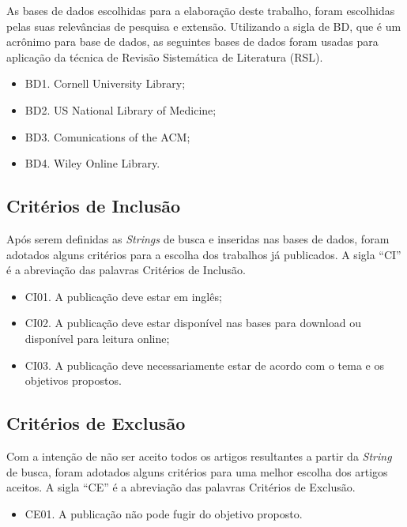 As bases de dados escolhidas para a elaboração deste trabalho, foram escolhidas pelas suas relevâncias de pesquisa e extensão. Utilizando a sigla de BD, que é um acrônimo para base de dados, as seguintes bases de dados foram usadas para aplicação da técnica de Revisão Sistemática de Literatura (RSL).

\begin{itemize}
    \item BD1. Cornell University Library;
    \item BD2. US National Library of Medicine;
    \item BD3. Comunications of the ACM;
    \item BD4. Wiley Online Library.
\end{itemize} 

\subsection{Critérios de Inclusão}
\label{subsec:inclusao}

Após serem definidas as \textit{Strings} de busca e inseridas nas bases de dados, foram adotados alguns critérios para a escolha dos trabalhos já publicados. A sigla “CI” é a abreviação das palavras Critérios de Inclusão.

\begin{itemize}
    \item CI01. A publicação deve estar em inglês;
    \item CI02. A publicação deve estar disponível nas bases para download ou disponível para leitura online;
    \item CI03. A publicação deve necessariamente estar de acordo com o tema e os objetivos propostos.
\end{itemize}

\subsection{Critérios de Exclusão}
\label{subsec:exclusao}

Com a intenção de não ser aceito todos os artigos resultantes a partir da \textit{String} de busca, foram adotados alguns critérios para uma melhor escolha dos artigos aceitos. A sigla “CE” é a abreviação das palavras Critérios de Exclusão. 

\begin{itemize}
    \item CE01. A publicação não pode fugir do objetivo proposto.
\end{itemize}